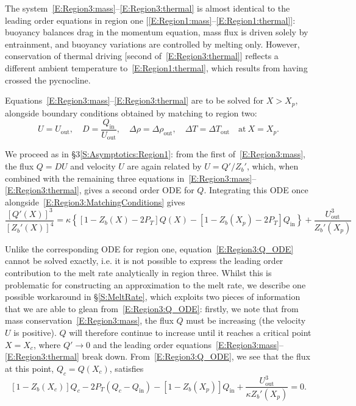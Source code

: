 \documentclass[openacc]{rsproca_new}%
\newcommand{\Pt}{\textit{P}_T}
\renewcommand{\in}{\text{in}} %
\newcommand{\out}{\text{out}}
\begin{document}
The system~\eqref{E:Region3:mass}--\eqref{E:Region3:thermal} is almost identical to the leading order equations in region one [\eqref{E:Region1:mass}--\eqref{E:Region1:thermal}]: buoyancy balances drag in the momentum equation, mass flux is driven solely by entrainment, and buoyancy variations are controlled by melting only. However, conservation of thermal driving [second of~\eqref{E:Region3:thermal}] reflects a different ambient temperature to~\eqref{E:Region1:thermal}, which results from having crossed the pycnocline.

Equations~\eqref{E:Region3:mass}--\eqref{E:Region3:thermal} are to be solved for $X > X_p$, alongside boundary conditions obtained by matching to region two:
\begin{equation}\label{E:Region3:MatchingConditions}
U = U_\out, \quad D = \frac{Q_\in}{U_\out}, \quad \Delta \rho = \Delta \rho_\out, \quad \Delta T = \Delta T_\out \quad \text{at}~X = X_p.
\end{equation}

We proceed as in \S3\ref{S:Asymptotics:Region1}: from the first of~\eqref{E:Region3:mass}, the flux $Q = DU$ and velocity $U$ are again related by $U =Q'/Z_b'$,
which, when combined with the remaining three equations in~\eqref{E:Region3:mass}--\eqref{E:Region3:thermal}, gives a second order ODE for $Q$. Integrating this ODE once alongside~\eqref{E:Region3:MatchingConditions} gives
\begin{equation}\label{E:Region3:Q_ODE}
\frac{\left[Q'(X)\right]^3}{\left[Z_b'(X)\right]^4} = \kappa \left\{ \left[1 - Z_b(X) - 2P_T\right] Q(X) - \left[1 - Z_b(X_p) - 2P_T\right]Q_\text{in}\right\} + \frac{U_\text{out}^3}{Z_b'(X_p)}
\end{equation}

Unlike the corresponding ODE for region one, equation~\eqref{E:Region3:Q_ODE} cannot be solved exactly, i.e. it is not possible to express the leading order contribution to the melt rate analytically in region three. Whilst this is problematic for constructing an approximation to the melt rate, we describe one possible workaround in \S\ref{S:MeltRate}, which exploits two pieces of information that we are able to glean from~\eqref{E:Region3:Q_ODE}: firstly, we note that from mass conservation~\eqref{E:Region3:mass}, the flux $Q$ must be increasing (the velocity $U$ is positive). $Q$ will therefore continue to increase until it reaches a critical point $X = X_c$, where $Q' \to 0$ and the leading order equations~\eqref{E:Region3:mass}--\eqref{E:Region3:thermal} break down. From~\eqref{E:Region3:Q_ODE}, we see that the flux at this point, $Q_c = Q(X_c)$, satisfies 
\begin{equation}
\left[1 - Z_b(X_c)\right]Q_c - 2\Pt\left(Q_c - Q_\in\right) -\left[1 - Z_b(X_p)\right]Q_\in +  \frac{U_\out^3}{\kappa Z_b'(X_p)} = 0.
\end{equation}
\end{document}
